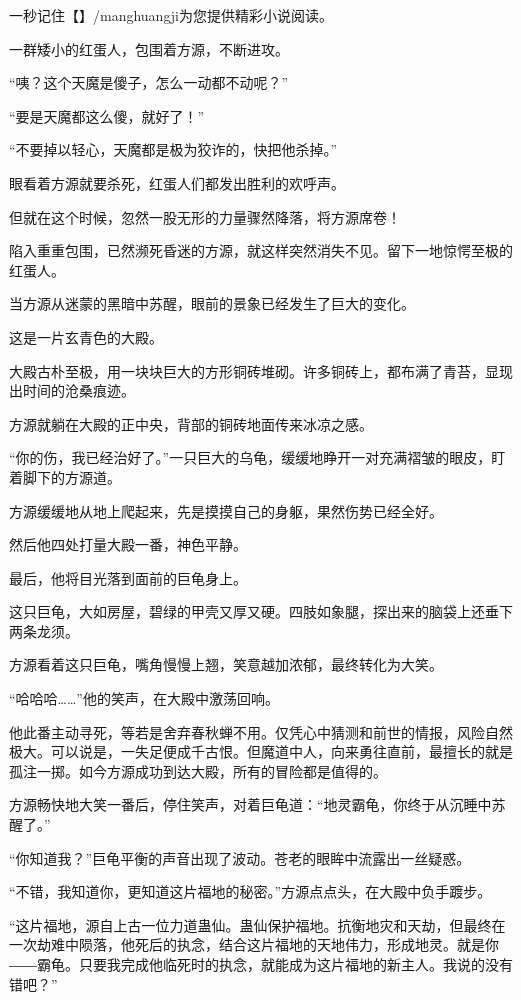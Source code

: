 
\begin{this_body}

一秒记住【】/manghuangji为您提供精彩小说阅读。

一群矮小的红蛋人，包围着方源，不断进攻。

“咦？这个天魔是傻子，怎么一动都不动呢？”

“要是天魔都这么傻，就好了！”

“不要掉以轻心，天魔都是极为狡诈的，快把他杀掉。”

眼看着方源就要杀死，红蛋人们都发出胜利的欢呼声。

但就在这个时候，忽然一股无形的力量骤然降落，将方源席卷！

陷入重重包围，已然濒死昏迷的方源，就这样突然消失不见。留下一地惊愕至极的红蛋人。

当方源从迷蒙的黑暗中苏醒，眼前的景象已经发生了巨大的变化。

这是一片玄青色的大殿。

大殿古朴至极，用一块块巨大的方形铜砖堆砌。许多铜砖上，都布满了青苔，显现出时间的沧桑痕迹。

方源就躺在大殿的正中央，背部的铜砖地面传来冰凉之感。

“你的伤，我已经治好了。”一只巨大的乌龟，缓缓地睁开一对充满褶皱的眼皮，盯着脚下的方源道。

方源缓缓地从地上爬起来，先是摸摸自己的身躯，果然伤势已经全好。

然后他四处打量大殿一番，神色平静。

最后，他将目光落到面前的巨龟身上。

这只巨龟，大如房屋，碧绿的甲壳又厚又硬。四肢如象腿，探出来的脑袋上还垂下两条龙须。

方源看着这只巨龟，嘴角慢慢上翘，笑意越加浓郁，最终转化为大笑。

“哈哈哈……”他的笑声，在大殿中激荡回响。

他此番主动寻死，等若是舍弃春秋蝉不用。仅凭心中猜测和前世的情报，风险自然极大。可以说是，一失足便成千古恨。但魔道中人，向来勇往直前，最擅长的就是孤注一掷。如今方源成功到达大殿，所有的冒险都是值得的。

方源畅快地大笑一番后，停住笑声，对着巨龟道：“地灵霸龟，你终于从沉睡中苏醒了。”

“你知道我？”巨龟平衡的声音出现了波动。苍老的眼眸中流露出一丝疑惑。

“不错，我知道你，更知道这片福地的秘密。”方源点点头，在大殿中负手踱步。

“这片福地，源自上古一位力道蛊仙。蛊仙保护福地。抗衡地灾和天劫，但最终在一次劫难中陨落，他死后的执念，结合这片福地的天地伟力，形成地灵。就是你――霸龟。只要我完成他临死时的执念，就能成为这片福地的新主人。我说的没有错吧？”


\end{this_body}
